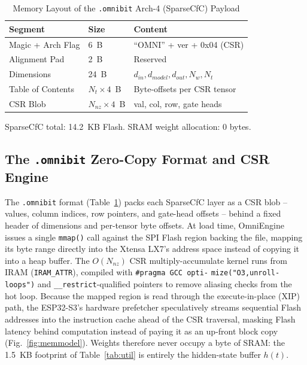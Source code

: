 \documentclass[10pt,journal]{IEEEtran}
\begin{document}
\begin{table}[t]
\caption{Memory Layout of the \texttt{.omnibit} Arch-4 (SparseCfC) Payload}
\label{tab:layout}
\centering\footnotesize
\begin{tabular}{@{}lll@{}}
\toprule
Segment & Size & Content \\
\midrule
Magic + Arch Flag & 6~B & ``OMNI'' + ver + 0x04 (CSR) \\
Alignment Pad & 2~B & Reserved \\
Dimensions & 24~B & $d_{in}, d_{model}, d_{out}, N_w, N_t$ \\
Table of Contents & $N_t\!\times\!4$~B & Byte-offsets per CSR tensor \\
CSR Blob & $N_{nz}\!\times\!4$~B & val, col, row, gate heads \\
\bottomrule
\end{tabular}
\vspace{2pt}
{\raggedright\scriptsize SparseCfC total: 14.2~KB Flash. SRAM weight allocation: 0 bytes.\par}
\vspace{-6pt}
\end{table}

\subsection{The \texttt{.omnibit} Zero-Copy Format and CSR Engine}
\label{sec:zerocopy}

The \texttt{.omnibit} format (Table~\ref{tab:layout}) packs each SparseCfC layer as a CSR blob -- values, column indices, row pointers, and gate-head offsets -- behind a fixed header of dimensions and per-tensor byte offsets. At load time, OmniEngine issues a single \texttt{mmap()} call against the SPI Flash region backing the file, mapping its byte range directly into the Xtensa LX7's address space instead of copying it into a heap buffer. The $O(N_{nz})$ CSR multiply-accumulate kernel runs from IRAM (\texttt{IRAM\_ATTR}), compiled with \texttt{\#pragma GCC opti-} \texttt{mize("O3,unroll-loops")} and \texttt{\_\_restrict}-qualified pointers to remove aliasing checks from the hot loop. Because the mapped region is read through the execute-in-place (XIP) path, the ESP32-S3's hardware prefetcher speculatively streams sequential Flash addresses into the instruction cache ahead of the CSR traversal, masking Flash latency behind computation instead of paying it as an up-front block copy (Fig.~\ref{fig:memmodel}). Weights therefore never occupy a byte of SRAM: the 1.5~KB footprint of Table~\ref{tab:util} is entirely the hidden-state buffer $h(t)$.
\end{document}
